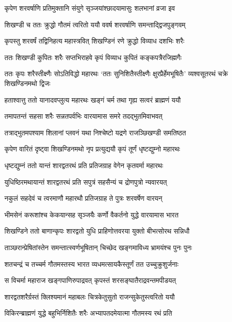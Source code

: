 \twolineshloka
{कृपेण शरवर्षाणि प्रतिमुक्तानि संयुगे}
{सृञ्जयांश्छादयामासुः शलभानां व्रजा इव}


\twolineshloka
{शिखण्डी च ततः क्रुद्धो गौतमं त्वरितो ययौ}
{ववर्ष शरवर्षाणि समन्ताद्द्विजपुङ्गवम्}


\twolineshloka
{कृपस्तु शरवर्षं तद्विनिहत्य महास्त्रवित्}
{शिखण्डिनं रणे क्रुद्धो विव्याध दशभिः शरैः}


\twolineshloka
{ततः शिखण्डी कुपितः शरैः सप्तभिराहवे}
{कृपं विव्याध कुपितं कङ्कपत्रैरजिह्मगैः}


\threelineshloka
{ततः कृपः शरैस्तीक्ष्णैः सोऽतिविद्धो महारथः}
{`ततः सुनिशितैस्तीक्ष्णैः क्षुरप्रैर्हेमभूषितैः'}
{व्यश्वसूतरथं चक्रे शिखण्डिनमथो द्विजः}


\twolineshloka
{हताश्वात्तु ततो यानादवप्लुत्य महारथः}
{खङ्गं चर्म तथा गृह्य सत्वरं ब्राह्मणं ययौ}


\twolineshloka
{तमापतन्तं सहसा शरैः सन्नतपर्वभिः}
{वारयामास समरे तदद्भुतमिवाभवत्}


\twolineshloka
{तत्राद्भुतमपश्याम शिलानां प्लवनं यथा}
{निश्चेष्टो यद्रणे राजञ्छिखण्डी समतिष्ठत}


\twolineshloka
{कृपेण वारितं दृष्ट्वा शिखण्डिनमथो नृप}
{प्रत्युद्ययौ कृपं तूर्णं धृष्टद्युम्नो महारथः}


\twolineshloka
{धृष्टद्युम्नं ततो यान्तं शारद्वतरथं प्रति}
{प्रतिजग्राह वेगेन कृतवर्मा महारथः}


\twolineshloka
{युधिष्ठिरमथायान्तं शारद्वतरथं प्रति}
{सपुत्रं सहसैन्यं च द्रोणपुत्रो न्यवारयत्}


\twolineshloka
{नकुलं सहदेवं च त्वरमाणौ महारथौ}
{प्रतिजग्राह ते पुत्रः शरवर्षेण वारयन्}


\twolineshloka
{भीमसेनं करूशांश्च केकयान्सह सृञ्जयैः}
{कर्णो वैकर्तनो युद्धे वारयामास भारत}


\twolineshloka
{शिखण्डिने ततो बाणान्कृपः शारद्वतो युधि}
{प्राहिणोत्तवरया युक्तो बीभत्सोरथ सन्निधौ}


\twolineshloka
{ताञ्छरान्प्रेषितांस्तेन समन्तात्स्वर्णभूषितान्}
{चिच्छेद खङ्गमाविध्य भ्रामयंश्च पुनः पुनः}


\twolineshloka
{शतचन्द्रं च तच्चर्म गौतमस्तस्य भारत}
{व्यधमत्सायकैस्तूर्णं तत उच्चुक्रुशुर्जनाः}


\twolineshloka
{स विचर्मा महाराज खङ्गपाणिरुपाद्रवत्}
{कृपस्तं शरसङ्घातैराद्रवन्तमपीडयत्}


\twolineshloka
{शारद्वतशरैर्ग्रस्तं क्लिश्यमानं महाबलः}
{चित्रकेतुसुतो राजन्सुकेतुस्त्वरितो ययौ}


\twolineshloka
{विकिरन्ब्राह्मणं युद्धे बहुभिर्निशितैः शरैः}
{अभ्यापतदमेयात्मा गौतमस्य रथं प्रति}


